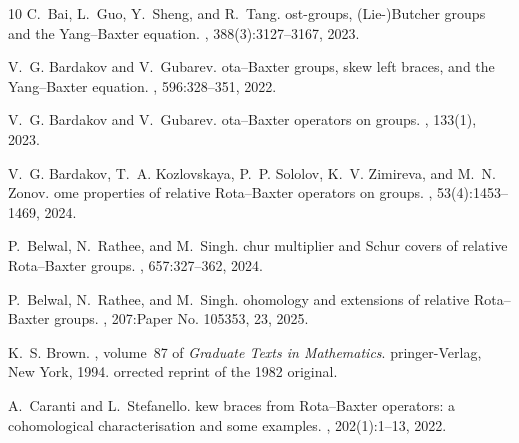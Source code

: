 \documentclass{jonasart}
\theoremstyle{plain}
\begin{document}
	
	{\footnotesize
    \begin{thebibliography}{10}    
        C.~{B}ai, L.~{G}uo, Y.~{S}heng, and R.~{T}ang.
        ost-groups, ({L}ie-){B}utcher groups and the {Y}ang--{B}axter
        equation.
        , 388(3):3127–3167, 2023.
        
        V.~G. {B}ardakov and V.~{G}ubarev.
        ota--{B}axter groups, skew left braces, and the {Y}ang--{B}axter
        equation.
        , 596:328–351, 2022.
        
        V.~G. {B}ardakov and V.~{G}ubarev.
        ota--{B}axter operators on groups.
        , 133(1), 2023.
        
        V.~G. {B}ardakov, T.~A. {K}ozlovskaya, P.~P. {S}ololov, K.~V. {Z}imireva, and
        M.~N. {Z}onov.
        ome properties of relative {R}ota--{B}axter operators on groups.
        , 53(4):1453–1469, 2024.
        
        P.~{B}elwal, N.~{R}athee, and M.~{S}ingh.
        chur multiplier and {S}chur covers of relative {R}ota--{B}axter
        groups.
        , 657:327–362, 2024.
        
        P.~{B}elwal, N.~{R}athee, and M.~{S}ingh.
        ohomology and extensions of relative {R}ota--{B}axter groups.
        , 207:{P}aper {N}o.
        105353, 23, 2025.
        
        K.~S. {B}rown.
        , volume~87 of {\em {G}raduate {T}exts in
        {M}athematics}.
        pringer-{V}erlag, {N}ew {Y}ork, 1994.
        orrected reprint of the 1982 original.
        
        A.~{C}aranti and L.~{S}tefanello.
        kew braces from {R}ota--{B}axter operators: a cohomological
        characterisation and some examples.
        ,
        202(1):1–13, 2022.
        

\end{thebibliography}}
\end{document}
